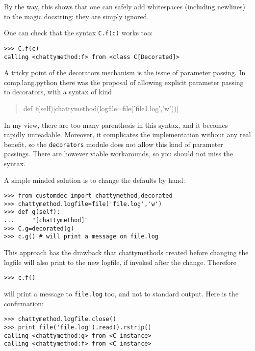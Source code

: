 \documentclass[11pt,english]{article}
\begin{document}
By the way, this shows that one can safely add whitespaces (including
newlines) to the magic docstring: they are simply ignored.

One can check that the syntax \texttt{C.f(c)} works too:
\begin{verbatim}>>> C.f(c) 
calling <chattymethod:f> from <class C[Decorated]>\end{verbatim}

A tricky point of the decorators mechanism is the issue of parameter passing.
In comp.lang.python there was the proposal of allowing explicit parameter
passing to decorators, with a syntax of kind
\begin{quote}
\begin{ttfamily}\begin{flushleft}
\mbox{def~f(self)[chattymethod(logfile=file('file1.log','w'))]}
\end{flushleft}\end{ttfamily}
\end{quote}

In my view, there are too many parenthesis in this syntax, and it 
becomes rapidly unreadable. Moreover, it complicates the implementation
without any real benefit, so the \texttt{decorators} module does not allow
this kind of parameter passings. There are however viable
workarounds, so you should not miss the syntax.

A simple minded solution is to change the defaults by hand:
\begin{verbatim}>>> from customdec import chattymethod,decorated
>>> chattymethod.logfile=file('file.log','w')
>>> def g(self): 
...     "[chattymethod]"
>>> C.g=decorated(g)
>>> c.g() # will print a message on file.log\end{verbatim}

This approach has the drawback that chattymethods created before changing 
the logfile will also print to the new logfile, if invoked after the
change. Therefore
\begin{verbatim}>>> c.f()\end{verbatim}

will print a message to \texttt{file.log} too, and not to standard output.
Here is the confirmation:
\begin{verbatim}>>> chattymethod.logfile.close()
>>> print file('file.log').read().rstrip()
calling <chattymethod:g> from <C instance>
calling <chattymethod:f> from <C instance>\end{verbatim}
\end{document}

